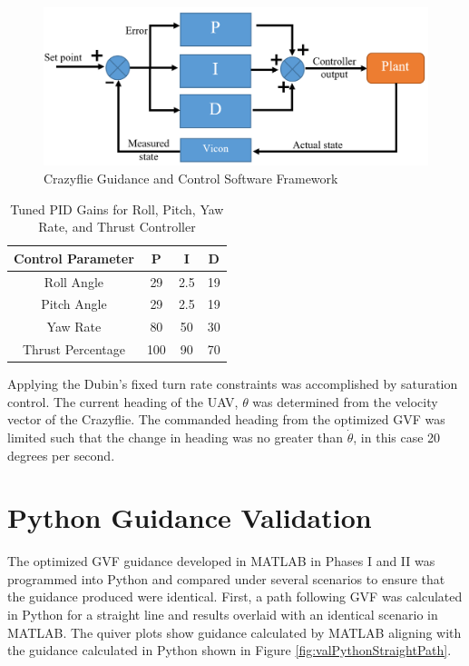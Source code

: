 \documentclass[numbered,pdftex]{ohio-etd}
\begin{document}
\begin{figure}[H]
	\centering
	\includegraphics[trim=0 0 0 0,clip,width=14cm]{PaperFigures/Methods/pid}
	\caption{Crazyflie Guidance and Control Software Framework}
	\label{fig:pid}
\end{figure}

\begin{table}[H]
	\centering
	\caption{Tuned PID Gains for Roll, Pitch, Yaw Rate, and Thrust Controller}
	\label{table:pidGains}
	\begin{tabular}{|c|c|c|c|}
		\hline 
		Control Parameter & P & I & D \\ 
		\hline 
		Roll Angle & 29 & 2.5 & 19 \\ 
		\hline 
		Pitch Angle & 29 & 2.5 & 19 \\ 
		\hline 
		Yaw Rate & 80 & 50 & 30 \\ 
		\hline 
		Thrust Percentage & 100 & 90 & 70 \\ 
		\hline 
	\end{tabular}
\end{table}
 
Applying the Dubin's fixed turn rate constraints was accomplished by saturation control. The current heading of the UAV, $\theta$ was determined from the velocity vector of the Crazyflie. The commanded heading from the optimized GVF was limited such that the change in heading was no greater than $\dot{\theta}$, in this case 20  degrees  per  second.
 
 \section{Python Guidance Validation}

The optimized GVF guidance developed in MATLAB in Phases I and II was programmed into Python and compared under several scenarios to ensure that the guidance produced were identical. First, a path following GVF was calculated in Python for a straight line and results overlaid with an identical scenario in MATLAB. The quiver plots show guidance calculated by MATLAB aligning with the guidance calculated in Python shown in Figure \ref{fig:valPythonStraightPath}.
\end{document}
